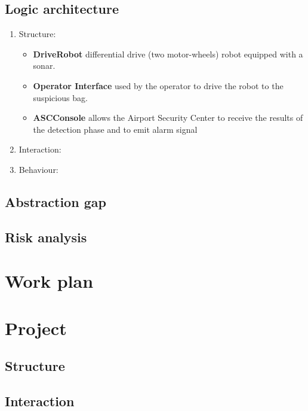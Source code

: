 \documentclass{llncs}
\newcommand{\labelsec}[1]{\label{sec:#1}}
\begin{document}
\subsection{Logic architecture}

\begin{enumerate}
\item Structure:
\begin{itemize}
\item \textbf{DriveRobot} differential drive (two motor-wheels) robot equipped with a sonar.
\item \textbf{Operator Interface} used by the operator to drive the robot to the suspicious bag.
\item \textbf{ASCConsole} allows the Airport Security Center to receive the results of the detection phase and to emit alarm signal
\end{itemize}
\item Interaction: 
\item Behaviour:
\end{enumerate}
\subsection{Abstraction gap}
\subsection{Risk analysis}

\section{Work plan}
\labelsec{wplan}

\section{Project}
\labelsec{Project}

\subsection{Structure}
\subsection{Interaction}
\end{document}
